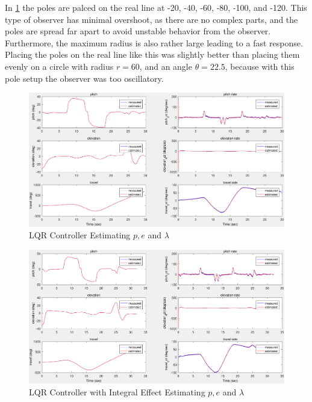 In \cref{fig:LQR_Estimator} the poles are palced on the real line at -20, -40, -60, -80, -100, and -120. This type of observer has minimal overshoot, as there are no complex parts, and the poles are spread far apart to avoid unstable behavior from the observer. Furthermore, the maximum radius is also rather large leading to a fast response. Placing the poles on the real line like this was slightly better than placing them evenly on a circle with radius $r = 60$, and an angle $\theta = 22.5$, because with this pole setup the observer was too oscillatory.
\begin{figure}[p]
\caption{LQR Controller Estimating $p, e$ and $\lambda$}
	\begin{center}
		\includegraphics[angle = 90, width = \textwidth]{images/542_LQR_Estimator.pdf}
	\end{center}
	\label{fig:LQR_Estimator}
\end{figure}

\begin{figure}[p]
\caption{LQR Controller with Integral Effect Estimating $p, e$ and $\lambda$}
	\begin{center}
		\includegraphics[angle = 90, width = \textwidth]{images/542_LQRIntegralEffect_Estimator.pdf}
	\end{center}
	\label{fig:LQRIntegralEffect_Estimator}
\end{figure}

